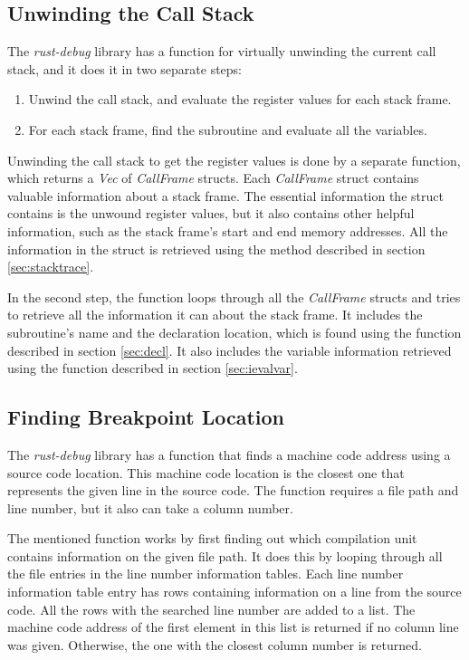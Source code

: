 \subsection{Unwinding the Call Stack}
The \emph{rust-debug} library has a function for virtually unwinding the current call stack, and it does it in two separate steps:


\begin{enumerate}
  \item Unwind the call stack, and evaluate the register values for each stack frame.
  \item For each stack frame, find the subroutine and evaluate all the variables.
\end{enumerate}


Unwinding the call stack to get the register values is done by a separate function, which returns a \emph{Vec} of \emph{CallFrame} structs.
Each \emph{CallFrame} struct contains valuable information about a stack frame.
The essential information the struct contains is the unwound register values, but it also contains other helpful information, such as the stack frame's start and end memory addresses.
All the information in the struct is retrieved using the method described in section \ref{sec:stacktrace}.


In the second step, the function loops through all the \emph{CallFrame} structs and tries to retrieve all the information it can about the stack frame.
It includes the subroutine's name and the declaration location, which is found using the function described in section \ref{sec:decl}.
It also includes the variable information retrieved using the function described in section \ref{sec:ievalvar}.



\subsection{Finding Breakpoint Location}
The \emph{rust-debug} library has a function that finds a machine code address using a source code location.
This machine code location is the closest one that represents the given line in the source code.
The function requires a file path and line number, but it also can take a column number.


The mentioned function works by first finding out which compilation unit contains information on the given file path.
It does this by looping through all the file entries in the line number information tables.
Each line number information table entry has rows containing information on a line from the source code.
All the rows with the searched line number are added to a list.
The machine code address of the first element in this list is returned if no column line was given.
Otherwise, the one with the closest column number is returned.



